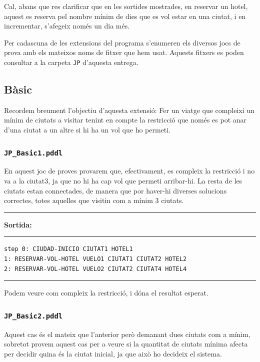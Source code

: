 \documentclass[11pt,a4paper]{article}
\begin{document}
Cal, abans que res clarificar que en les sortides mostrades, en reservar un hotel, aquest es reserva pel nombre mínim de dies que es vol estar en una ciutat, i en incrementar, s'afegeix només un dia més.

Per cadascuna de les extensions del programa s'enumeren els diversos jocs de prova amb els mateixos noms de fitxer que hem usat. Aquests fitxers es poden consultar a la carpeta \texttt{JP} d'aquesta entrega.

\subsection{Bàsic}

Recordem breument l'objectiu d'aquesta extensió: Fer un viatge que compleixi un mínim de ciutats a visitar tenint en compte la restricció que només es pot anar d'una ciutat a un altre si hi ha un vol que ho permeti.

\subsubsection*{\texttt{JP\_Basic1.pddl}}

En aquest joc de proves provarem que, efectivament, es compleix la restricció i no va a la ciutat3, ja que no hi ha cap vol que permeti arribar-hi. La resta de les ciutats estan connectades, de manera que por haver-hi diverses solucions correctes, totes aquelles que visitin com a mínim 3 ciutats.

\begin{samepage}
\medskip
\noindent
\rule{0.1\textwidth}{0.5mm}
\textbf{Sortida:}
\rule{0.76\textwidth}{0.5mm}
\begin{verbatim}
step 0: CIUDAD-INICIO CIUTAT1 HOTEL1
1: RESERVAR-VOL-HOTEL VUELO1 CIUTAT1 CIUTAT2 HOTEL2
2: RESERVAR-VOL-HOTEL VUELO2 CIUTAT2 CIUTAT4 HOTEL4
\end{verbatim}
\rule{\textwidth}{0.5mm}
\medskip
\end{samepage}

Podem veure com compleix la restricció, i dóna el resultat esperat.

\subsubsection*{\texttt{JP\_Basic2.pddl}}

Aquest cas és el mateix que l'anterior però demanant dues ciutats com a mínim, sobretot provem aquest cas per a veure si la quantitat de ciutats mínima afecta per decidir quina és la ciutat inicial, ja que això ho decideix el sistema.
\end{document}
